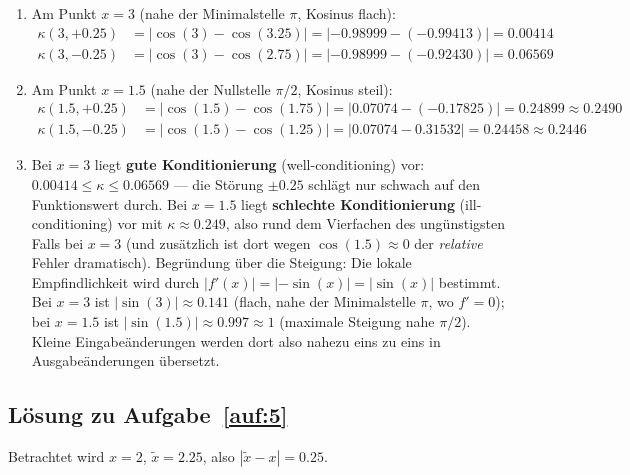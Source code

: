 \documentclass[a4paper,11pt]{scrartcl}
\begin{document}
\begin{enumerate}[label=(\alph*)]
  \item Am Punkt $x = 3$ (nahe der Minimalstelle $\pi$, Kosinus flach):
  \begin{align*}
  \kappa(3, +0.25) &= |\cos(3) - \cos(3.25)| = |-0.98999 - (-0.99413)| = 0.00414 \\
  \kappa(3, -0.25) &= |\cos(3) - \cos(2.75)| = |-0.98999 - (-0.92430)| = 0.06569
  \end{align*}
  \item Am Punkt $x = 1.5$ (nahe der Nullstelle $\pi/2$, Kosinus steil):
  \begin{align*}
  \kappa(1.5, +0.25) &= |\cos(1.5) - \cos(1.75)| = |0.07074 - (-0.17825)| = 0.24899 \approx 0.2490 \\
  \kappa(1.5, -0.25) &= |\cos(1.5) - \cos(1.25)| = |0.07074 - 0.31532| = 0.24458 \approx 0.2446
  \end{align*}
  \item Bei $x = 3$ liegt \textbf{gute Konditionierung} (well-conditioning) vor: $0.00414 \leq \kappa \leq 0.06569$ --- die Störung $\pm 0.25$ schlägt nur schwach auf den Funktionswert durch. Bei $x = 1.5$ liegt \textbf{schlechte Konditionierung} (ill-conditioning) vor mit $\kappa \approx 0.249$, also rund dem Vierfachen des ungünstigsten Falls bei $x = 3$ (und zusätzlich ist dort wegen $\cos(1.5) \approx 0$ der \emph{relative} Fehler dramatisch). Begründung über die Steigung: Die lokale Empfindlichkeit wird durch $|f'(x)| = |{-\sin(x)}| = |\sin(x)|$ bestimmt. Bei $x = 3$ ist $|\sin(3)| \approx 0.141$ (flach, nahe der Minimalstelle $\pi$, wo $f' = 0$); bei $x = 1.5$ ist $|\sin(1.5)| \approx 0.997 \approx 1$ (maximale Steigung nahe $\pi/2$). Kleine Eingabeänderungen werden dort also nahezu eins zu eins in Ausgabeänderungen übersetzt.
\end{enumerate}

\subsection*{Lösung zu Aufgabe~\ref{auf:5}}

Betrachtet wird $x = 2$, $\tilde{x} = 2.25$, also $|\tilde{x} - x| = 0.25$.
\end{document}
